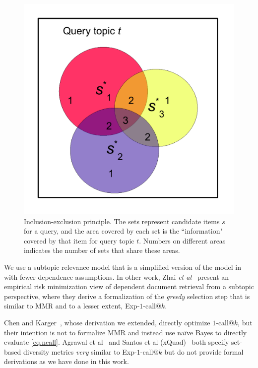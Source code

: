 \begin{figure}[t!]
\begin{center}
\centerline{\includegraphics[scale = 0.4]{inclusionExclusionPrinciple}}
\caption[Inclusion-exclusion principle.]{Inclusion-exclusion principle. The sets represent candidate
items $s$ for a query, and the area covered by each set is the
``information" covered by that item for query topic $t$. Numbers on different areas
indicates the number of sets that share these areas. }
\label{fig:inclusionExclusionPrinciple}
\end{center}
\end{figure}

 We use a subtopic relevance
model that is a simplified version of the model in~\cite{plmmr} with
fewer dependence assumptions.  In other work, Zhai {\it et
al}~\cite{zhai03Beyond} present an empirical risk minimization view of
dependent document retrieval from a subtopic perspective,
where they derive a formalization of the
\emph{greedy} selection step that is similar to MMR and to a lesser
extent, Exp-$1$-call@$k$.

 Chen and
Karger~\cite{chen06Less}, whose derivation we extended, directly
optimize $1$-call@$k$, but their intention is not to formalize MMR and
instead use na\"{i}ve Bayes to directly evaluate
\eqref{eq.ncall}.  Agrawal et al~\cite{agrawal09diversifying}
and Santos et al (xQuad)~\cite{santos2010xquad} both specify set-based
diversity metrics \emph{very} similar to Exp-$1$-call@$k$ but do not provide
formal derivations as we have done in this work.

